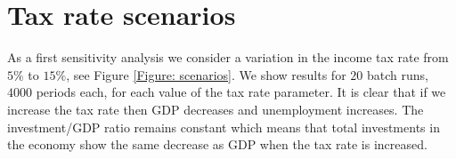 \section{Tax rate scenarios}
As a first sensitivity analysis we consider a variation in the income tax rate from $5\%$ to $15\%$, see Figure \ref{Figure: scenarios}.
We show results for $20$ batch runs, $4000$ periods each, for each value of the tax rate parameter.
It is clear that if we increase the tax rate then GDP decreases and unemployment increases.
The investment/GDP ratio remains constant which means that total investments in the economy show the same decrease as GDP when the tax rate is increased.




%


